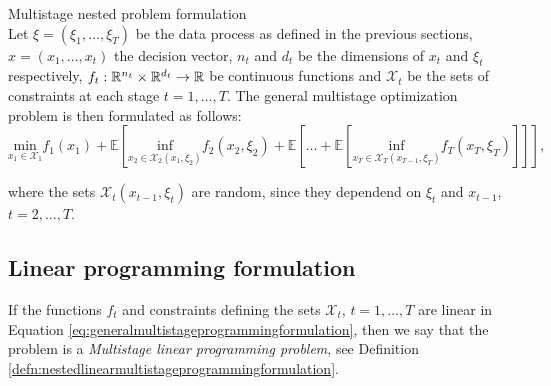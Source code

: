 \begin{defn}{Multistage nested problem formulation \cite[Section 3.1.1.]{stochasticprogrammingbible2009}} \\
Let $\xi=(\xi_1,\dots,\xi_{T})$ be the data process as defined in the previous sections, \\ $x=(x_1,\dots,x_t)$ the decision vector, $n_t$ and $d_t$ be the dimensions of $x_t$ and $\xi_t$ respectively, $f_t: \mathbb{R}^{n_t} \times \mathbb{R}^{d_t} \rightarrow \mathbb{R}$ be continuous functions and $
\mathcal{X}_t$ be the sets of constraints at each stage $t=1,\dots,T$. The general multistage optimization problem is then formulated as follows:
\footnotesize
\begin{equation}
\label{eq:generalmultistageprogrammingformulation}
\underset{x_1 \in \mathcal{X}_1}{\mathrm{min}}
 f_1(x_1) + \mathbb{E}\left[ \underset{x_2 \in \mathcal{X}_2(x_1, \xi_2)}{\mathrm{inf}} f_2(x_2,\xi_2) + \mathbb{E}\left[\dots + \mathbb{E}\left[ \underset{x_T \in \mathcal{X}_T(x_{T-1}, \xi_T)}{\mathrm{inf}} f_T(x_T,\xi_T)\right] \right] \right],
\end{equation}

\normalsize
where the sets $\mathcal{X}_t(x_{t-1},\xi_t)$ are random, since they dependend on $\xi_t$ and $x_{t-1}$, $t=2,\dots,T$.
\end{defn}


\subsection{Linear programming formulation}
If the functions $f_t$ and constraints defining the sets $\mathcal{X}_t$, $t=1,\dots,T$ are linear in Equation \ref{eq:generalmultistageprogrammingformulation}, then we say that the problem is a \textit{Multistage linear programming problem}, see Definition \ref{defn:nestedlinearmultistageprogrammingformulation}.

